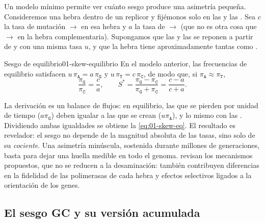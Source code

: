 Un modelo mínimo permite ver cuánto sesgo produce una asimetría pequeña. Consideremos una hebra dentro de un replicor y fijémonos solo en las  y las . Sea $c$ la tasa de mutación $\to$ en esa hebra y $a$ la tasa de $\to$ (que no es otra cosa que $\to$ en la hebra complementaria). Supongamos que las  y las  se reponen a partir de  y  con una misma tasa $u$, y que la hebra tiene aproximadamente tantas  como .

\begin{teorema}{Sesgo de equilibrio}{01-skew-equilibrio}
En el modelo anterior, las frecuencias de equilibrio satisfacen $u\,\pi_\texttt{A} = a\,\pi_\texttt{G}$ y $u\,\pi_\texttt{T} = c\,\pi_\texttt{C}$, de modo que, si $\pi_\texttt{A}\approx\pi_\texttt{T}$,
\begin{equation}\label{eq:01-skew-eq}
\frac{\pi_\texttt{G}}{\pi_\texttt{C}} = \frac{c}{a},
\qquad
S^* = \frac{\pi_\texttt{G}-\pi_\texttt{C}}{\pi_\texttt{G}+\pi_\texttt{C}} = \frac{c-a}{c+a} .
\end{equation}
\end{teorema}

\begin{simbolos}
\end{simbolos}

La derivación es un balance de flujos: en equilibrio, las  que se pierden por unidad de tiempo ($a\pi_\texttt{G}$) deben igualar a las que se crean ($u\pi_\texttt{A}$), y lo mismo con las . Dividiendo ambas igualdades se obtiene la \cref{eq:01-skew-eq}. El resultado es revelador: el sesgo no depende de la magnitud absoluta de las tasas, sino solo de su \emph{cociente}. Una asimetría minúscula, sostenida durante millones de generaciones, basta para dejar una huella medible en todo el genoma. \textcite{c01-frank1999} revisan los mecanismos propuestos, que no se reducen a la desaminación: también contribuyen diferencias en la fidelidad de las polimerasas de cada hebra y efectos selectivos ligados a la orientación de los genes.

\subsection{El sesgo GC y su versión acumulada}

